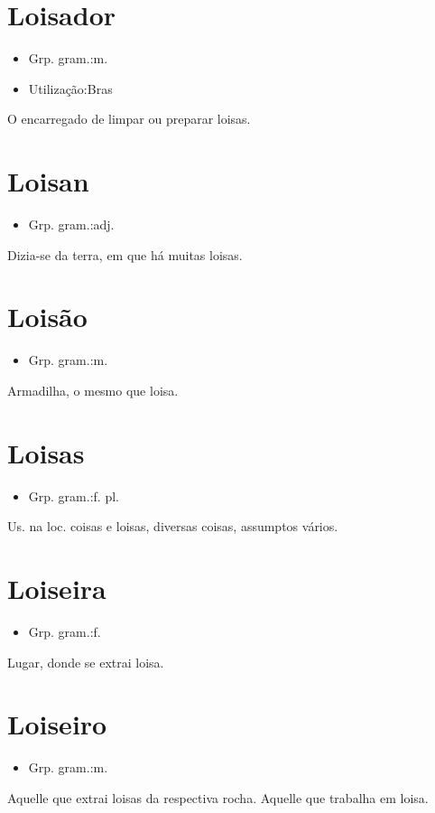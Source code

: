 \section{Loisador}
\begin{itemize}
\item {Grp. gram.:m.}
\end{itemize}
\begin{itemize}
\item {Utilização:Bras}
\end{itemize}
O encarregado de limpar ou preparar loisas.
\section{Loisan}
\begin{itemize}
\item {Grp. gram.:adj.}
\end{itemize}
Dizia-se da terra, em que há muitas loisas.
\section{Loisão}
\begin{itemize}
\item {Grp. gram.:m.}
\end{itemize}
Armadilha, o mesmo que \textunderscore loisa\textunderscore .
\section{Loisas}
\begin{itemize}
\item {Grp. gram.:f. pl.}
\end{itemize}
Us. na loc. \textunderscore coisas e loisas\textunderscore , diversas coisas, assumptos vários.
\section{Loiseira}
\begin{itemize}
\item {Grp. gram.:f.}
\end{itemize}
Lugar, donde se extrai loisa.
\section{Loiseiro}
\begin{itemize}
\item {Grp. gram.:m.}
\end{itemize}
Aquelle que extrai loisas da respectiva rocha.
Aquelle que trabalha em loisa.
